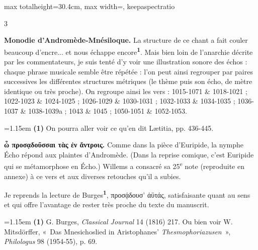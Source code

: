 \documentclass[11pt,twoside]{book}
\newcommand{\italique}[1]{\textit{#1}}
\newcommand{\nieme}[1]{#1\textsuperscript{e}}
\newcommand{\marqueur}[1]{\textsuperscript{\color{rubricRed}\textbf{#1}}}
\begin{document}
\begin{adjustbox}{max totalheight=30.4cm, max width=\textwidth, keepaspectratio}
\begin{minipage}{\textwidth}
{\begin{multicols}{3}
\par\vspace{1.5pt}
 \textbf{Monodie d'Andromède-Mnésiloque.} La structure de ce chant a fait couler beaucoup d'encre... et nous échappe encore\marqueur{1}. Mais bien loin de l'anarchie décrite par les commentateurs, je suis tenté d'y voir une illustration sonore des échos : chaque phrase musicale semble être répétée : l'on peut ainsi regrouper par paires successives les différentes structures métriques (le thème puis son écho, de mètre identique ou très proche). On regroupe ainsi les vers : 1015-1071 \& 1018-1021 ; 1022-1023 \& 1024-1025 ; 1026-1029 \& 1030-1031 ; 1032-1033 \& 1034-1035 ; 1036-1037 \& 1038-1039a ; 1043 \& 1045 ; 1050-1051 \& 1052-1053.
\par\vspace{1.5pt}
\par\vspace{1.2pt}\par\nopagebreak\vspace{1pt}\noindent\hangindent=1.15em {\color{sepiaNote}\textbf{(1)}} On pourra aller voir ce qu'en dit Lætitia, pp. 436-445.
\par\vspace{1.5pt}
 \textbf{ὦ προσᾳδοῦσσαι τὰς ἐν ἄντροις.} Comme dans la pièce d'Euripide, la nymphe Écho répond aux plaintes d'Andromède. (Dans la reprise comique, c'est Euripide qui se métamorphose en Écho.) Willems a consacré sa \nieme{25} note (reproduite en annexe) à ce vers et aux diverses retouches qu'il a subies.
\par\vspace{1.5pt}
\noindent Je reprends la lecture de Burges\marqueur{1}, προσᾴδουσ' ἀϋτάς, satisfaisante quant au sens et qui offre l'avantage de rester très proche du texte du manuscrit.
\par\vspace{1.5pt}
\par\vspace{1.2pt}\par\nopagebreak\vspace{1pt}\noindent\hangindent=1.15em {\color{sepiaNote}\textbf{(1)}} G. Burges, \italique{Classical Journal} 14 (1816) 217. Ou bien voir W. Mitsdörffer, «~Das Mnesichoslied in Aristophanes' \italique{Thesmophoriazusen}~», \italique{Philologus} 98 (1954-55), p. 69.

\end{multicols}}
\end{minipage}
\end{adjustbox}
\end{document}
